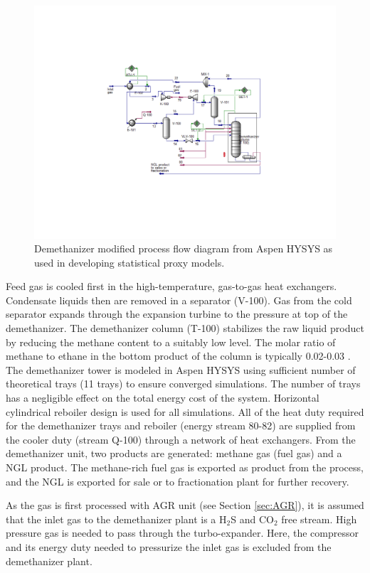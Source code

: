 \documentclass[11pt]{report}
\begin{document}
\begin{figure}
\includegraphics[width=0.85\columnwidth]{images/demethanizer_aspen.pdf}
\caption{Demethanizer modified process flow diagram from Aspen HYSYS as used in developing statistical proxy models.}
\label{fig:demethanizer_aspen}
\end{figure}

Feed gas is cooled first in the high-temperature, gas-to-gas heat exchangers. Condensate liquids then are removed in a separator (V-100). Gas from the cold separator expands through the expansion turbine to the pressure at top of the demethanizer. The demethanizer column (T-100) stabilizes the raw liquid product by reducing the methane content to a suitably low level. The molar ratio of methane to ethane in the bottom product of the column is typically 0.02-0.03 \cite{Manning1991}. The demethanizer tower is modeled in Aspen HYSYS using sufficient number of theoretical trays (11 trays) to ensure converged simulations. The number of trays has a negligible effect on the total energy cost of the system. Horizontal cylindrical reboiler design is used for all simulations. All of the heat duty required for the demethanizer trays and reboiler (energy stream 80-82) are supplied from the cooler duty (stream Q-100) through a network of heat exchangers. From the demethanizer unit, two products are generated: methane gas (fuel gas) and a NGL product. The methane-rich fuel gas is exported as product from the process, and the NGL is exported for sale or to fractionation plant for further recovery. 

As the gas is first processed with AGR unit (see Section \ref{sec:AGR}), it is assumed that the inlet gas to the demethanizer plant is a H$_2$S and CO$_2$ free stream. High pressure gas is needed to pass through the turbo-expander. Here, the compressor and its energy duty needed to pressurize the inlet gas is excluded from the demethanizer plant. 
\end{document}
